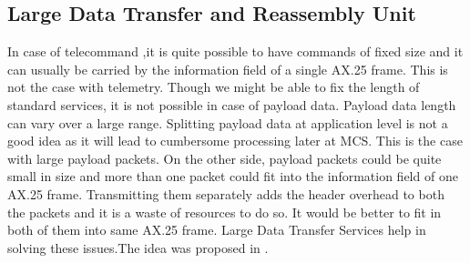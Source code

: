 \documentclass[BTech]{iitmdiss}
\begin{document}
\subsection{Large Data Transfer and Reassembly Unit}
In case of telecommand ,it is quite possible to have commands of fixed size and it can usually be carried by the information field of a single AX.25 frame. This is not the case with telemetry. Though we might be able to fix the length of standard services, it is not possible in case of payload data. Payload data length can vary over a large range. Splitting payload data at application level is not a good idea as it will lead to cumbersome processing later at MCS. This is the case with large payload packets. On the other side, payload packets could be quite small in size and more than one packet could fit into the information field of one AX.25 frame. Transmitting them separately adds the header overhead to both the packets and it is  a waste of resources to do so. It would be better to fit in both of them into same AX.25 frame. Large Data Transfer Services help in solving these issues.The idea was proposed in \citep{ecss}.
\end{document}
